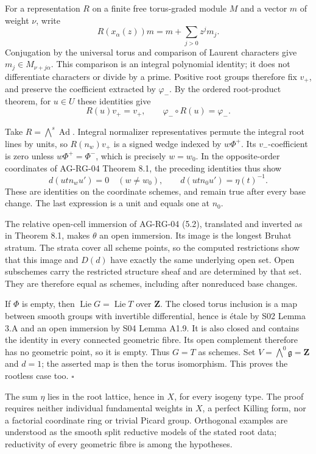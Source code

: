 \documentclass[11pt,a4paper,openany]{report}
\begin{document}
For a representation \(R\) on a finite free torus-graded module \(M\) and a vector \(m\) of weight \(\nu\), write \[
R(x_\alpha(z))m=m+\sum_{j>0}z^j m_j.
\] Conjugation by the universal torus and comparison of Laurent characters give \(m_j\in M_{\nu+j\alpha}\). This comparison is an integral polynomial identity; it does not differentiate characters or divide by a prime. Positive root groups therefore fix \(v_+\), and preserve the coefficient extracted by \(\varphi_-\). By the ordered root-product theorem, for \(u\in U\) these identities give \[
R(u)v_+=v_+,
\qquad\varphi_-\circ R(u)=\varphi_-.
\]

Take \(R=\bigwedge^s\operatorname{Ad}\). Integral normalizer representatives permute the integral root lines by units, so \(R(n_w)v_+\) is a signed wedge indexed by \(w\Phi^+\). Its \(v_-\)-coefficient is zero unless \(w\Phi^+=\Phi^-\), which is precisely \(w=w_0\). In the opposite-order coordinates of AG-RG-04 Theorem 8.1, the preceding identities thus show \[
d(utn_wu')=0\quad(w\ne w_0),
\qquad d(utn_0u')=\eta(t)^{-1}.
\] These are identities on the coordinate schemes, and remain true after every base change. The last expression is a unit and equals one at \(n_0\).

The relative open-cell immersion of AG-RG-04 (5.2), translated and inverted as in Theorem 8.1, makes \(\theta\) an open immersion. Its image is the longest Bruhat stratum. The strata cover all scheme points, so the computed restrictions show that this image and \(D(d)\) have exactly the same underlying open set. Open subschemes carry the restricted structure sheaf and are determined by that set. They are therefore equal as schemes, including after nonreduced base changes.

If \(\Phi\) is empty, then \(\operatorname{Lie}G=\operatorname{Lie}T\) over \(\mathbf Z\). The closed torus inclusion is a map between smooth groups with invertible differential, hence is étale by S02 Lemma 3.A and an open immersion by S04 Lemma A1.9. It is also closed and contains the identity in every connected geometric fibre. Its open complement therefore has no geometric point, so it is empty. Thus \(G=T\) as schemes. Set \(V=\bigwedge^0\mathfrak g=\mathbf Z\) and \(d=1\); the asserted map is then the torus isomorphism. This proves the rootless case too. \(\square\)

The sum \(\eta\) lies in the root lattice, hence in \(X\), for every isogeny type. The proof requires neither individual fundamental weights in \(X\), a perfect Killing form, nor a factorial coordinate ring or trivial Picard group. Orthogonal examples are understood as the smooth split reductive models of the stated root data; reductivity of every geometric fibre is among the hypotheses.
\end{document}
